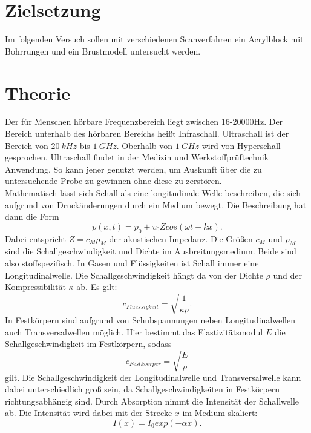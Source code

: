 \section{Zielsetzung}
\label{sec:Zielsetzung}
Im folgenden Versuch sollen mit verschiedenen Scanverfahren ein Acrylblock mit Bohrrungen und ein Brustmodell untersucht werden.
\section{Theorie}
\label{sec:Theorie}
Der für Menschen hörbare Frequenzbereich liegt zwischen 16-20000Hz. Der Bereich unterhalb des hörbaren Bereichs heißt Infraschall. Ultraschall ist der Bereich von 
$\SI{20}{kHz}$ bis $\SI{1}{GHz}$. Oberhalb von $\SI{1}{GHz}$ wird von Hyperschall gesprochen. Ultraschall findet in der Medizin und Werkstoffprüftechnik Anwendung. So kann jener
genutzt werden, um Auskunft über die zu untersuchende Probe zu gewinnen ohne diese zu zerstören.\\
Mathematisch lässt sich Schall als eine longitudinale Welle beschreiben, die sich aufgrund von Druckänderungen durch ein Medium bewegt. Die Beschreibung hat dann die Form
\begin{equation*}
    p(x, t) = p_0 + v_0 Z cos(\omega t - kx).
\end{equation*}
Dabei entspricht $Z = c_M \rho_M$ der akustischen Impedanz. Die Größen $c_M$ und $\rho_M$ sind die Schallgeschwindigkeit und Dichte im Ausbreitungsmedium. Beide sind also
stoffspezifisch.
In Gasen und Flüssigkeiten ist Schall immer eine Longitudinalwelle. Die Schallgeschwindigkeit hängt da von der Dichte $\rho$ und der Kompressibilität $\kappa$ ab. Es gilt:
\begin{equation*}
    c_{Fluessigkeit} = \sqrt{\frac{1}{\kappa \rho}}.
\end{equation*}
In Festkörpern sind aufgrund von Schubspannungen neben Longitudinalwellen auch Transversalwellen möglich. Hier bestimmt das Elastizitätsmodul $E$ die Schallgeschwindigkeit
im Festkörpern, sodass
\begin{equation*}
    c_{Festkoerper} = \sqrt{\frac{E}{\rho}}
\end{equation*}
gilt.
Die Schallgeschwindigkeit der Longitudinalwelle und Transversalwelle kann dabei unterschiedlich groß sein, da Schallgeschwindigkeiten in Festkörpern richtungsabhängig sind.
Durch Absorption nimmt die Intensität der Schallwelle ab. Die Intensität wird dabei mit der Strecke $x$ im Medium skaliert:
\begin{equation*}
    I(x) = I_0 exp(-\alpha x).
\end{equation*}
